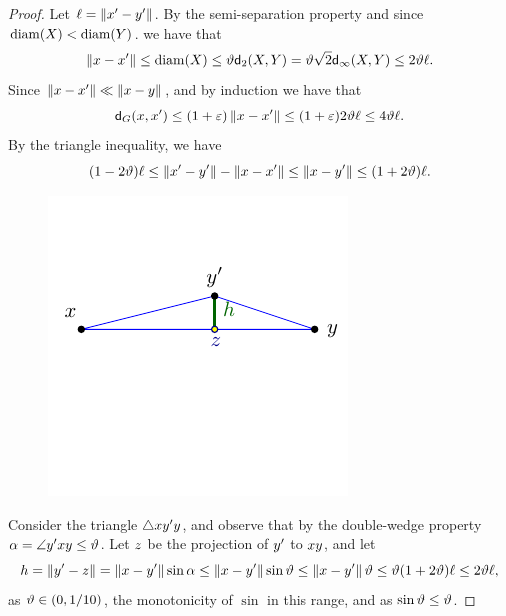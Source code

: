 \documentclass[12pt]{article}%
\begin{document}
\begin{proof}

    
    Let $\ell = \left\| x' - y' \right\|$. By the semi-separation property and
    since $\diameterX{\PSX} < \diameterX{\PSY}$.  we have that
    \begin{equation*}
        \dY{\px}{\px'}%
        \leq%
        \diameterX{\PSX}%
        \leq%
        \epsA \dGZ{2}{\PSX}{\PSY}%
        =%
        \epsA \sqrt{2} \dGZ{\infty}{\PSX}{\PSY}%
        \leq 
        2
        \epsA \ell.
    \end{equation*}
    Since $\left\| x - x' \right\| \ll \left\| x - y \right\|$, and by induction we have
    that
    \begin{equation*}
        \dGZ{\G}{\px}{\px'}%
        \leq%
        (1+\eps)\dY{\px}{\px'}
        \leq%
        (1+\eps) 2\epsA \ell
        \leq%
        4\epsA \ell.
    \end{equation*}
    By the triangle inequality, we have
    \begin{equation*}
        (1-2\epsA)\ell
        \leq
        \dY{\px'}{\py'} - \dY{\px}{\px'}
        \leq%
        \dY{\px}{\py'}%
        \leq%
        (1+2\epsA)\ell.
    \end{equation*}


    \begin{figure}[h]
        \hfill%
        \includegraphics{figs/triangle}%
        \hfill%
        \phantom{}%
        \caption{}
    \end{figure}

    Consider the triangle $\triangle x y' y$, and observe that
    by the double-wedge property
    $\alpha = \angle y' x y \leq \vartheta$.  Let $z$ be the
    projection of $y'$ to $x y$, and let
    \begin{equation*}
        h%
        =%
        \dY{\py'}{ \pz}%
        =%
        \dY{\px}{\py'} \sin \alpha
        \leq
        \dY{\px}{\py'} \sin \epsA
        \leq%
        \dY{\px}{\py'}  \epsA
        \leq%
        \epsA (1+2 \epsA)\ell
        \leq 
        2 \epsA \ell,
    \end{equation*}
    as $\vartheta \in (0,1/10)$, the monotonicity of $\sin$ in this range,
    and as $\sin \vartheta \leq \vartheta$.
    

\end{proof}
\end{document}
